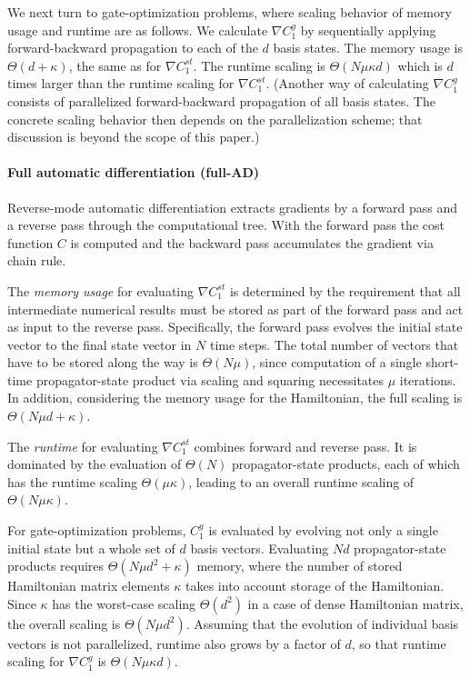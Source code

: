 \documentclass[letterpaper,10pt]{iopart}
\begin{document}
We next turn to gate-optimization problems, where scaling behavior of memory usage and runtime are as follows. We calculate $\nabla C_1^{ g}$ by sequentially 
applying forward-backward propagation to each of the $d$ basis states. The memory usage is $\Theta(d+\kappa)$, the same as for $\nabla C_1^{st}$. The runtime scaling is $\Theta(N\mu\kappa d)$ which is $d$ times larger than the runtime scaling for $\nabla C_1^{st}$. (Another way of calculating $\nabla C_1^{ g}$ consists of parallelized forward-backward propagation of all basis states. The concrete scaling behavior then depends on the parallelization scheme; that discussion is beyond the scope of this paper.)



\paragraph{Full automatic differentiation (full-AD)}
Reverse-mode automatic differentiation extracts gradients by a forward pass and a reverse pass through the computational tree. With the forward pass the cost function $C$ is computed and the backward pass accumulates the gradient via chain rule.

The \textit{memory usage} for evaluating $\nabla C_1^{st}$ is determined by the requirement that all intermediate numerical results must be stored as part of the forward pass and act as input to the reverse pass. Specifically, the forward pass evolves the initial state vector to the final state vector in $N$ time steps. The total number of vectors that have to be stored along the way is $\Theta
(N\mu)$, since computation of a single short-time propagator-state product via scaling and squaring necessitates $\mu$ iterations. In addition, considering the memory usage for the Hamiltonian, the full scaling is $\Theta(N\mu d +\kappa)$. 

The \textit{runtime} for evaluating $\nabla C_1^{st}$ combines forward and reverse pass. It is dominated by the evaluation of $\Theta(N)$ propagator-state products, each of which has the runtime scaling $\Theta(\mu\kappa)$, leading to an overall runtime scaling of $\Theta(N\mu \kappa )$.

For gate-optimization problems, $C_1^{ g}$ is evaluated by evolving not only a single initial state but a whole set of $d$ basis vectors. Evaluating $Nd$ propagator-state products requires $\Theta(N\mu d^2+\kappa)$ memory, where the number of stored Hamiltonian matrix elements  $\kappa$ takes into account storage of the Hamiltonian. Since $\kappa$ has the worst-case scaling $\Theta(d^2)$ in a case of dense Hamiltonian matrix, the overall scaling is $\Theta(N\mu d^2)$. Assuming that the evolution of individual basis vectors is not parallelized, runtime also grows by a factor of $d$, so that runtime scaling for $\nabla C_1^{ g}$ is $\Theta(N\mu\kappa d)$.
\end{document}
